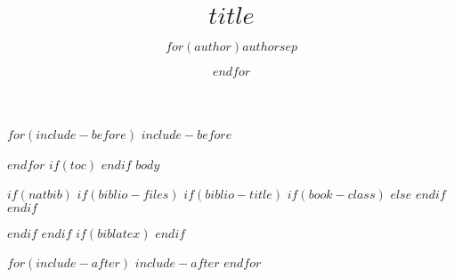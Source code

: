 \documentclass[$if(fontsize)$$fontsize$,$endif$$if(lang)$$lang$,$endif$$if(papersize)$$papersize$,$endif$$for(classoption)$$classoption$$sep$,$endfor$]{apa6}
\title{$title$}
\author{$for(author)$$author$$sep$ \and $endfor$}
\affiliation{$affiliation$}
\begin{document}
\maketitle

$for(include-before)$
$include-before$

$endfor$
$if(toc)$
{
\hypersetup{linkcolor=black}
\setcounter{tocdepth}{$toc-depth$}
\tableofcontents
}
$endif$
$body$

$if(natbib)$
$if(biblio-files)$
$if(biblio-title)$
$if(book-class)$
  \renewcommand\bibname{$biblio-title$}
$else$
  \renewcommand\refname{$biblio-title$}
$endif$
$endif$


$endif$
$endif$
$if(biblatex)$
  \printbibliography
$endif$

$for(include-after)$
  $include-after$
$endfor$
\end{document}
